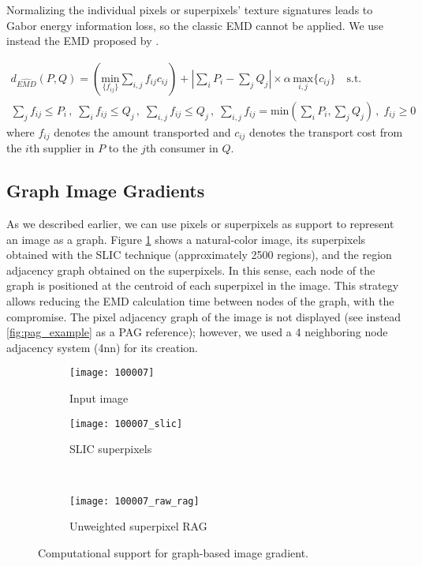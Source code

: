 Normalizing the individual pixels or superpixels' texture signatures leads to Gabor energy information loss, so the classic EMD cannot be applied. We use instead the EMD proposed by \citep{Pele.Werman::2008}.

\begin{eqnarray}
d_{\widehat{EMD}}(P, Q) = \left( \underset{\{f_{ij}\}}{\mathrm{min}}\sum_{i,j}f_{ij}c_{ij}\right)
+ \left\vert \sum_{i} P_i - \sum_{j} Q_j \right\vert \times \alpha\, \underset{{i,j}}{\mathrm{max}} \{c_{ij}\}  \quad \text{s.t.}\nonumber \label{eq:emd_pele} \\
\sum_{j}f_{ij} \leq P_i \, , \; \sum_{i}f_{ij} \leq Q_j \, , \; \sum_{i,j}f_{ij} \leq Q_j \, , \; \sum_{i,j}f_{ij} = \mathrm{min} \left( \sum_{i} P_i , \sum_{j} Q_j\right)\, , \; f_{ij} \geq 0
\end{eqnarray}
where $f_{ij}$ denotes the amount transported and $c_{ij}$ denotes the transport cost from the $i$th supplier in $P$ to the $j$th consumer in $Q$. 

\subsection{Graph Image Gradients}
As we described earlier, we can use pixels or superpixels as support to represent an image as a graph. Figure \ref{fig:computational_support} shows a natural-color image, its superpixels obtained with the SLIC technique (approximately 2500 regions), and the region adjacency graph obtained on the superpixels. In this sense, each node of the graph is positioned at the centroid of each superpixel in the image. This strategy allows reducing the EMD calculation time between nodes of the graph, with the compromise. The pixel adjacency graph of the image is not displayed (see instead \ref{fig:pag_example} as a PAG reference); however, we used a 4 neighboring node adjacency system (4nn) for its creation.

\begin{figure}[!ht]
    \centering
    \begin{subfigure}[b]{0.49\textwidth}
    	\texttt{[image: 100007]} 
    	\caption{Input image}
    \end{subfigure}    
    \begin{subfigure}[b]{0.49\textwidth}
        \texttt{[image: 100007\_slic]}
        \caption{SLIC superpixels}
    \end{subfigure}\\    
    \begin{subfigure}[b]{0.49\textwidth}
        \texttt{[image: 100007\_raw\_rag]}
        \caption{Unweighted superpixel RAG}
    \end{subfigure}
    
	\caption{Computational support for graph-based image gradient.}\label{fig:computational_support}    
\end{figure}

